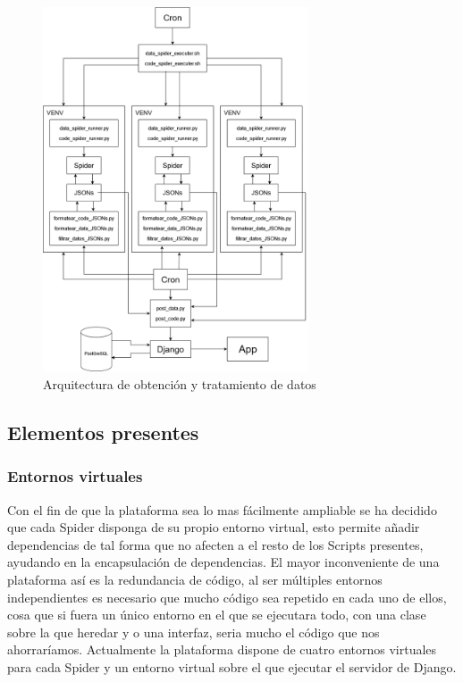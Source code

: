 \begin{figure} [h]
	\centering
	\includegraphics[width=0.7\textwidth]{fig/arquitectura.png}
	\caption[Arquitectura de obtención y tratamiento de datos]{Arquitectura de obtención y tratamiento de datos}
	\label{fig:ej7}
\end{figure}

\subsection{Elementos presentes}

\subsubsection{Entornos virtuales}
Con el fin de que la plataforma sea lo mas fácilmente ampliable se ha decidido que cada Spider disponga de su propio entorno virtual, esto permite añadir dependencias de tal forma que no afecten a el resto de los Scripts presentes, ayudando en la encapsulación de dependencias.\newline
\newline
El mayor inconveniente de una plataforma así es la redundancia de código, al ser múltiples entornos independientes es necesario que mucho código sea repetido en cada uno de ellos, cosa que si fuera un único entorno en el que se ejecutara todo, con una clase sobre la que heredar y o una interfaz, seria mucho el código que nos ahorraríamos.\newline
\newline
Actualmente la plataforma dispone de cuatro entornos virtuales para cada Spider y un entorno virtual sobre el que ejecutar el servidor de Django.

